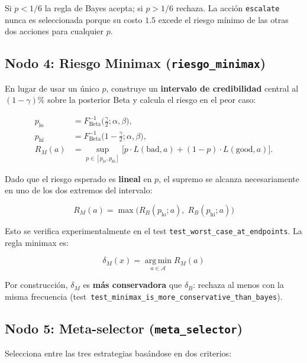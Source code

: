 \documentclass[11pt,a4paper]{article}
\theoremstyle{definition}
\newcommand{\A}{\mathcal{A}}
\newcommand{\Beta}{\operatorname{Beta}}
\begin{document}
Si $p < 1/6$ la regla de Bayes acepta; si $p > 1/6$ rechaza. La acción
\texttt{escalate} nunca es seleccionada porque su costo $1.5$ excede el
riesgo mínimo de las otras dos acciones para cualquier $p$.

\subsection{Nodo 4: Riesgo Minimax (\texttt{riesgo\_minimax})}

En lugar de usar un único $p$, construye un \textbf{intervalo de credibilidad}
central al $(1-\gamma)\%$ sobre la posterior Beta y calcula el riesgo en el
peor caso:

\begin{align}
	p_{\text{lo}} & = F_{\Beta}^{-1}\bigl(\tfrac{\gamma}{2}; \alpha,\beta\bigr),   \\
	p_{\text{hi}} & = F_{\Beta}^{-1}\bigl(1-\tfrac{\gamma}{2}; \alpha,\beta\bigr), \\
	R_M(a)        & = \sup_{p\in[p_{\text{lo}},p_{\text{hi}}]}
	\bigl[p \cdot L(\text{bad},a) + (1-p) \cdot L(\text{good},a)\bigr].
\end{align}

Dado que el riesgo esperado es \textbf{lineal} en $p$, el supremo se alcanza
necesariamente en uno de los dos extremos del intervalo:

\begin{equation}\label{eq:worst-case}
	R_M(a) = \max\bigl(R_B(p_{\text{lo}};a),\; R_B(p_{\text{hi}};a)\bigr)
\end{equation}

Esto se verifica experimentalmente en el test \texttt{test\_worst\_case\_at\_endpoints}.
La regla minimax es:

\begin{equation}\label{eq:minimax-rule}
	\delta_M(x) = \operatorname*{arg\,min}_{a\in\A} R_M(a)
\end{equation}

Por construcción, $\delta_M$ es \textbf{más conservadora} que $\delta_B$:
rechaza al menos con la misma frecuencia (test~\texttt{test\_minimax\_is\_more\_conservative\_than\_bayes}).

\subsection{Nodo 5: Meta-selector (\texttt{meta\_selector})}

Selecciona entre las tres estrategias basándose en dos criterios:
\end{document}
